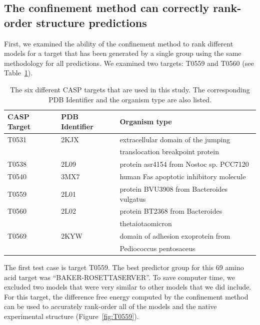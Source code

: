 \documentclass[12pt]{article}
\begin{document}
\subsection*{The confinement method can correctly rank-order structure predictions}

First, we examined the ability of the confinement method to rank different models for a target that
has been generated
by a single group using the same methodology for all predictions. We examined two targets: T0559 and T0560 (see Table~\ref{table:casp_testcase}). 


\begin{table}
\begin{center}
\caption{The six different CASP targets that are used in this study. The corresponding PDB Identifier and the 
         organism type are also listed.}
\label{table:casp_testcase}
\begin{tabular}{l l l}\hline
    CASP Target  & PDB Identifier &  Organism type  \\ \hline
     T0531       &    2KJX        &  extracellular domain of the jumping  \\
                 &                &  translocation breakpoint protein  \\ \hline
     T0538       &    2L09        &  protein asr4154 from Nostoc sp. PCC7120     \\ \hline
     T0540       &    3MX7        &  human Fas apoptotic inhibitory molecule     \\ \hline
     T0559       &    2L01        &  protein BVU3908 from Bacteroides vulgatus   \\ \hline
     T0560       &    2L02        &  protein BT2368 from Bacteroides  \\ 
                 &                &  thetaiotaomicron         \\ \hline
     T0569       &    2KYW        &  domain of adhesion exoprotein from \\ 
                 &                &   Pediococcus pentosaceus \\ \hline
\end{tabular}
\end{center}
\end{table}


The first test case is target T0559. The best predictor group for this 69 amino acid target was ``BAKER-ROSETTASERVER''.
To save computer time, we excluded two models that were very similar to other models that we did include. For this
target, the difference free energy computed by the confinement method can be used to accurately rank-order all of the
models and the native experimental structure (Figure~\ref{fig:T0559}).
\end{document}
